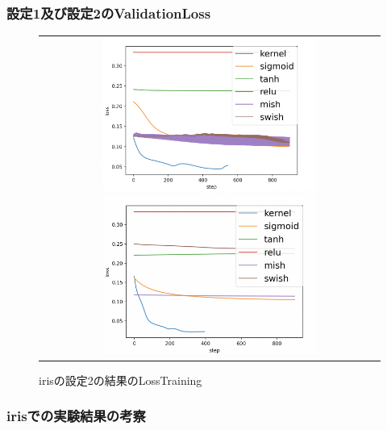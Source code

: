 \subsubsection{設定1及び設定2のValidationLoss}
\label{iris:loss}



\begin{figure}[hbtp]
    \begin{center}
        \begin{tabular}{c}
            \begin{minipage}{0.5\hsize}
                \includegraphics[clip, width=7cm]{asset/iris_0.1_1000_3_02_sgd_non_kaiming_uniform.png}
                    \caption{irisの設定1の結果のLossTraining}
                    \label{iris_1}
            \end{minipage}
            \hspace{10pt}
            \begin{minipage}{0.5\hsize}
                \includegraphics[clip, width=7cm]{asset/iris_0.1_1000_3_02_sgd_l2_kaiming_uniform.png}
                    \caption{irisの設定2の結果のLossTraining}
                    \label{iris_2}
            \end{minipage}
        \end{tabular}
    \end{center}
\end{figure}


\subsubsection{irisでの実験結果の考察}


